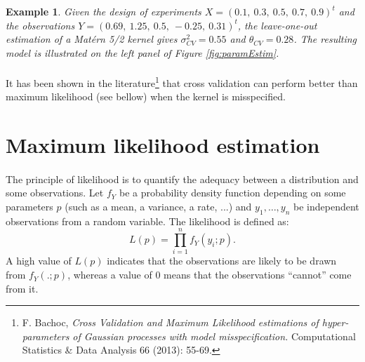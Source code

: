 \documentclass[twoside,openright]{report}
\newtheorem{example}{Example}
\begin{document}
\begin{example}
	Given the design of experiments $X=(0.1,\  0.3,\  0.5,\  0.7,\  0.9)^t$ and the observations $Y = (0.69,\ 1.25,\  0.5,\ -0.25,\ 0.31)^t$, the leave-one-out estimation of a Mat\'ern 5/2 kernel gives $\sigma^2_{CV}=0.55 $ and $\theta_{CV}=0.28$. The resulting model is illustrated on the left panel of Figure \ref{fig:paramEstim}.
\end{example}

\paragraph{}
It has been shown in the literature\footnote{F. Bachoc, \emph{Cross Validation and Maximum Likelihood estimations of hyper-parameters of Gaussian processes with model misspecification.} Computational Statistics \& Data Analysis 66 (2013): 55-69.} that cross validation can perform better than maximum likelihood (see bellow) when the kernel is misspecified.

\section{Maximum likelihood estimation} 
\paragraph{}
The principle of likelihood is to quantify the adequacy between a distribution and some observations. Let $f_Y$ be a probability density function depending on some parameters $p$ (such as a mean, a variance, a rate, ...) and  $y_1,\dots,y_n$ be independent observations from a random variable. The likelihood is defined as: 
\begin{equation}
 	L(p) = \prod_{i=1}^n f_Y(y_i;p).
\end{equation} 
A high value of $L(p)$ indicates that the observations are likely to be drawn from $f_Y(.;p)$, whereas a value of 0 means that the observations ``cannot'' come from it.  
\end{document}
